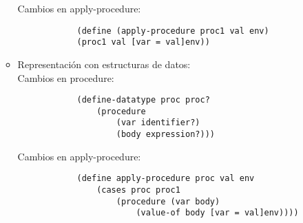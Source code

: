 \documentclass{article}
\begin{document}
\begin{itemize}
\begin{itemize}
\begin{Verbatim}
        \end{Verbatim}
        Cambios en apply-procedure:
        \begin{Verbatim}
            (define (apply-procedure proc1 val env)
            (proc1 val [var = val]env))
        \end{Verbatim}
        \item Representación con estructuras de datos:\\
        Cambios en procedure:
        \begin{Verbatim}
            (define-datatype proc proc?
                (procedure
                    (var identifier?)
                    (body expression?)))
        \end{Verbatim}
        Cambios en apply-procedure:
        \begin{verbatim}
            (define apply-procedure proc val env
                (cases proc proc1
                    (procedure (var body)
                        (value-of body [var = val]env))))
        \end{verbatim}
    \end{itemize}

\end{itemize}
\end{document}
